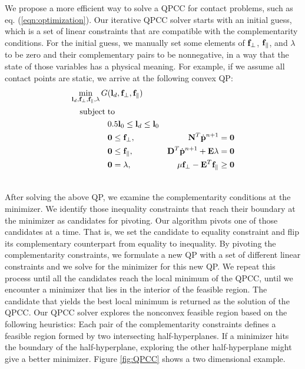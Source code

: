 We propose a more efficient way to solve a QPCC for contact problems, such as eq. (\ref{eqn:optimization}). Our iterative QPCC solver starts with an initial guess, which is a set of linear constraints that are compatible with the complementarity conditions. For the initial guess, we manually set some elements of $\mathbf{f}_\perp$, $\mathbf{f}_\parallel$, and $\lambda$ to be zero and their complementary pairs to be nonnegative, in a way that the state of those variables has a physical meaning. For example, if we assume all contact points are static, we arrive at the following convex QP:
\begin{align}
\min_{\mathbf{l}_d,\mathbf{f}_\perp,\mathbf{f}_\parallel,\lambda} G&(\mathbf{l}_d,\mathbf{f}_\perp,\mathbf{f}_\parallel) & \label{eqn:initialGuess} \\
\mathrm{subject\;} &\mathrm{to} & \nonumber\\
 & 0.5\mathbf{l}_0 \leq \mathbf{l}_d \leq \mathbf{l}_0 & \nonumber \\
 & \mathbf{0} \leq \mathbf{f}_\perp, & \mathbf{N}^T\dot{\mathbf{p}}^{n+1} = \mathbf{0} \label{eqn:initialGuess1}\\
 & \mathbf{0} \leq \mathbf{f}_\parallel, &  \mathbf{D}^T \dot{\mathbf{p}}^{n+1} + \mathbf{E} \lambda = \mathbf{0} \label{eqn:initialGuess2}\\
 & \mathbf{0} = \lambda, & \mu \mathbf{f}_\perp - \mathbf{E}^T \mathbf{f}_\parallel \geq \mathbf{0} \label{eqn:initialGuess3} \\
 \nonumber
\end{align}


After solving the above QP, we examine the complementarity conditions
at the minimizer. We identify those inequality constraints that reach
their boundary at the minimizer as candidates for pivoting. Our
algorithm pivots one of those candidates at a time. That is, we set
the candidate to equality constraint and flip its complementary
counterpart from equality to inequality. By pivoting the
complementarity constraints, we formulate a new QP with a set of different
linear constraints and we solve for the minimizer for this new
QP. We repeat this process until all the candidates reach the local
minimum of the QPCC, \ie until we encounter a minimizer that lies in the
interior of the feasible region. The candidate that yields the best
local minimum is returned as the solution of the QPCC. Our QPCC solver
explores the nonconvex feasible region based on the following
heuristics: Each pair of the complementarity constraints defines a
feasible region formed by two intersecting half-hyperplanes. If a minimizer hits the boundary of the half-hyperplane, exploring the other
half-hyperplane might give a better minimizer. Figure \ref{fig:QPCC}
shows a two dimensional example.

